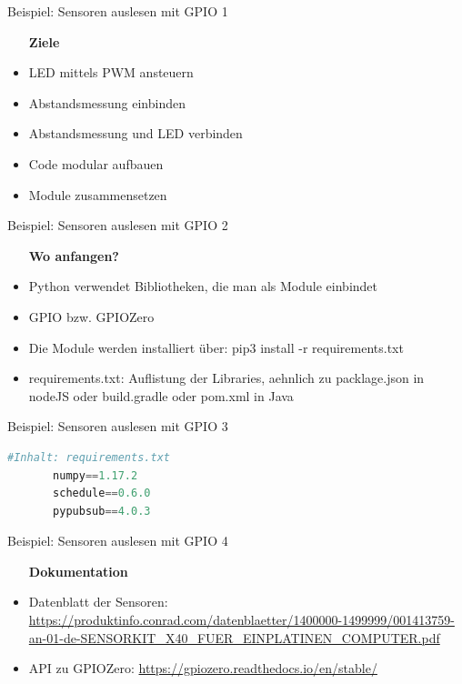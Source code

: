 \begin{frame}{Beispiel: Sensoren auslesen mit GPIO 1}
    \begin{itemize}
    \setlength{\itemindent}{.4in}
     \item [\textbf{ Ziele}]
    \end{itemize}
    \begin{itemize}
        \item  LED mittels PWM ansteuern
        \item  Abstandsmessung einbinden
        \item  Abstandsmessung und LED verbinden
        \item  Code modular aufbauen
        \item  Module zusammensetzen
     \end{itemize}
\end{frame}

\begin{frame}{Beispiel: Sensoren auslesen mit GPIO 2}
    \begin{itemize}
    \setlength{\itemindent}{1in}
     \item [\textbf{ Wo anfangen?}]
    \end{itemize}
    \begin{itemize}
        \item  Python verwendet Bibliotheken, die man als Module einbindet
        \item  GPIO bzw. GPIOZero
        \item  Die Module werden installiert über:  pip3 install -r requirements.txt
        \item  requirements.txt: Auflistung der Libraries, aehnlich zu packlage.json in nodeJS oder build.gradle oder pom.xml in Java
     \end{itemize}
\end{frame}

\begin{frame}[fragile]{Beispiel: Sensoren auslesen mit GPIO 3}
     \begin{lstlisting}[language=Python]
     #Inhalt: requirements.txt
       numpy==1.17.2
       schedule==0.6.0
       pypubsub==4.0.3
     \end{lstlisting}
\end{frame}

\begin{frame}{Beispiel: Sensoren auslesen mit GPIO 4}
    \begin{itemize}
    \setlength{\itemindent}{1.0in}
     \item [\textbf{ Dokumentation}]
    \end{itemize}

    \begin{itemize}
        \item  Datenblatt der Sensoren: \url{https://produktinfo.conrad.com/datenblaetter/1400000-1499999/001413759-an-01-de-SENSORKIT_X40_FUER_EINPLATINEN_COMPUTER.pdf}
        \item  API zu GPIOZero: \url{https://gpiozero.readthedocs.io/en/stable/}
     \end{itemize}
\end{frame}


